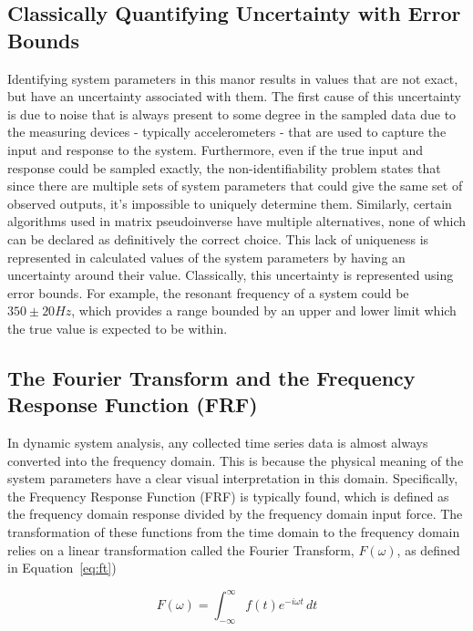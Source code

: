 \documentclass[12pt]{article}
\begin{document}
    \subsection{Classically Quantifying Uncertainty with Error Bounds}
    Identifying system parameters in this manor results in values that are not exact, but have an uncertainty associated with them.
    The first cause of this uncertainty is due to noise that is always present to some degree in the sampled data due to the measuring devices - typically accelerometers - that are used to capture the input and response to the system.
    Furthermore, even if the true input and response could be sampled exactly, the non-identifiability problem states that since there are multiple sets of system parameters that could give the same set of observed outputs, it's impossible to uniquely determine them.
    Similarly, certain algorithms used in  matrix pseudoinverse have multiple alternatives, none of which can be declared as definitively the correct choice.
    This lack of uniqueness is represented in calculated values of the system parameters by having an uncertainty around their value.
    Classically, this uncertainty is represented using error bounds.
    For example, the resonant frequency of a system could be $350 \pm 20 Hz$, which provides a range bounded by an upper and lower limit which the true value is expected to be within.


    \subsection{The Fourier Transform and the Frequency Response Function (FRF)}

    In dynamic system analysis, any collected time series data is almost always converted into the frequency domain.
    This is because the physical meaning of the system parameters have a clear visual interpretation in this domain. %
    Specifically, the Frequency Response Function (FRF) is typically found, which is defined as the frequency domain response divided by the frequency domain input force.
    The transformation of these functions from the time domain to the frequency domain relies on a linear transformation called the Fourier Transform, $F(\omega)$, as defined in Equation~\ref{eq:ft})

    \begin{equation}
        F(\omega) = \int_{-\infty}^{\infty} f(t) e^{-i \omega t} \, dt\label{eq:ft}
    \end{equation}
\end{document}
